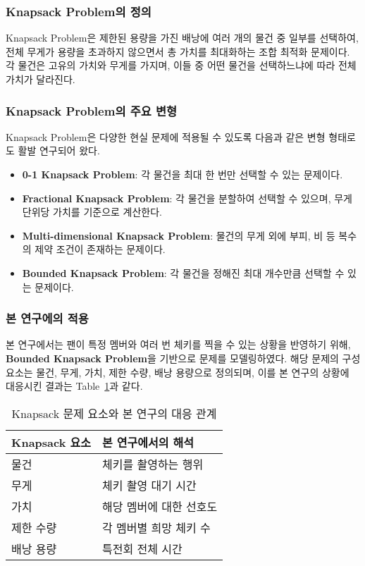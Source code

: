 \documentclass[12pt,hidelinks]{article}
\begin{document}
\subsubsection{Knapsack Problem의 정의}
Knapsack Problem은 제한된 용량을 가진 배낭에 여러 개의 물건 중 일부를 선택하여, 전체 무게가 용량을 초과하지 않으면서 총 가치를 최대화하는 조합 최적화 문제이다. 각 물건은 고유의 가치와 무게를 가지며, 이들 중 어떤 물건을 선택하느냐에 따라 전체 가치가 달라진다.
\subsubsection{Knapsack Problem의 주요 변형}
Knapsack Problem은 다양한 현실 문제에 적용될 수 있도록 다음과 같은 변형 형태로도 활발 연구되어 왔다.
\begin{itemize}
\item \textbf{0-1 Knapsack Problem}: 각 물건을 최대 한 번만 선택할 수 있는 문제이다.
\item \textbf{Fractional Knapsack Problem}: 각 물건을 분할하여 선택할 수 있으며, 무게 단위당 가치를 기준으로 계산한다.
\item \textbf{Multi-dimensional Knapsack Problem}: 물건의 무게 외에 부피, 비 등 복수의 제약 조건이 존재하는 문제이다.
\item \textbf{Bounded Knapsack Problem}: 각 물건을 정해진 최대 개수만큼 선택할 수 있는 문제이다.
\end{itemize}
\subsubsection{본 연구에의 적용}
본 연구에서는 팬이 특정 멤버와 여러 번 체키를 찍을 수 있는 상황을 반영하기 위해, \textbf{Bounded Knapsack Problem}을 기반으로 문제를 모델링하였다. 해당 문제의 구성 요소는 물건, 무게, 가치, 제한 수량, 배낭 용량으로 정의되며, 이를 본 연구의 상황에 대응시킨 결과는 Table~\ref{tab:components}과 같다.

\begin{table}[h]
	\centering
	\caption{Knapsack 문제 요소와 본 연구의 대응 관계}
	\label{tab:components}
	\begin{tabular}{|l|l|}
		\hline
		\textbf{Knapsack 요소} & \textbf{본 연구에서의 해석} \\
		\hline
		물건 & 체키를 촬영하는 행위 \\
		무게 & 체키 촬영 대기 시간 \\
		가치 & 해당 멤버에 대한 선호도 \\
		제한 수량 & 각 멤버별 희망 체키 수 \\
		배낭 용량 & 특전회 전체 시간 \\
		\hline
	\end{tabular}
\end{table}
\end{document}
